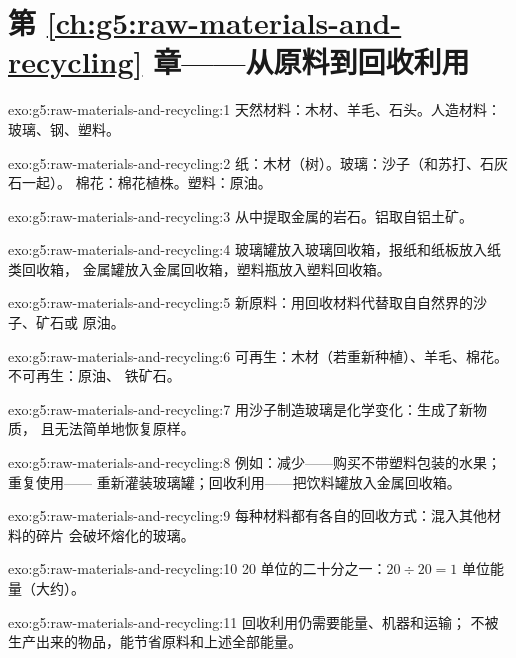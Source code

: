 \section*{第 \ref{ch:g5:raw-materials-and-recycling} 章——从原料到回收利用}

\begin{solution}{exo:g5:raw-materials-and-recycling:1}
天然材料：木材、羊毛、石头。人造材料：玻璃、钢、塑料。
\end{solution}

\begin{solution}{exo:g5:raw-materials-and-recycling:2}
纸：木材（树）。玻璃：沙子（和苏打、石灰石一起）。
棉花：棉花植株。塑料：原油。
\end{solution}

\begin{solution}{exo:g5:raw-materials-and-recycling:3}
从中提取金属的岩石。铝取自铝土矿。
\end{solution}

\begin{solution}{exo:g5:raw-materials-and-recycling:4}
玻璃罐放入玻璃回收箱，报纸和纸板放入纸类回收箱，
金属罐放入金属回收箱，塑料瓶放入塑料回收箱。
\end{solution}

\begin{solution}{exo:g5:raw-materials-and-recycling:5}
新原料：用回收材料代替取自自然界的沙子、矿石或
原油。
\end{solution}

\begin{solution}{exo:g5:raw-materials-and-recycling:6}
可再生：木材（若重新种植）、羊毛、棉花。不可再生：原油、
铁矿石。
\end{solution}

\begin{solution}{exo:g5:raw-materials-and-recycling:7}
用沙子制造玻璃是化学变化：生成了新物质，
且无法简单地恢复原样。
\end{solution}

\begin{solution}{exo:g5:raw-materials-and-recycling:8}
例如：减少——购买不带塑料包装的水果；重复使用——
重新灌装玻璃罐；回收利用——把饮料罐放入金属回收箱。
\end{solution}

\begin{solution}{exo:g5:raw-materials-and-recycling:9}
每种材料都有各自的回收方式：混入其他材料的碎片
会破坏熔化的玻璃。
\end{solution}

\begin{solution}{exo:g5:raw-materials-and-recycling:10}
20 单位的二十分之一：$20 \div 20 = 1$ 单位能量（大约）。
\end{solution}

\begin{solution}{exo:g5:raw-materials-and-recycling:11}
回收利用仍需要能量、机器和运输；
不被生产出来的物品，能节省原料和上述全部能量。
\end{solution}
